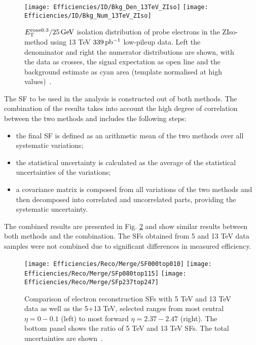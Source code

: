     \begin{figure}[htbp]
    \centering
    \texttt{[image: Efficiencies/ID/Bkg\_Den\_13TeV\_ZIso]}
    \texttt{[image: Efficiencies/ID/Bkg\_Num\_13TeV\_ZIso]}
    \caption{$E_{\text{T}}^\mathrm{cone0.3}/25 \,\text{Ge\kern -0.1em V}$ isolation distribution of
    	probe electrons in the ZIso-method using 13 TeV $339\,\mbox{pb\(^{-1}\)}$
    	low-pileup data. Left the denominator and right the numerator
    	distributions are shown, with the data as crosses, the signal \Zee
    	expectation as open line and the background estimate as cyan area
    	(template normalised at high values)~\cite{int_note_electrons}.}
    \label{fig:bkgfit_ziso}
    \end{figure} 
    
    The SF to be used in the analysis is constructed out of both methods. The combination of the results takes into account the high degree of correlation between the two methods and includes the following steps:
    \begin{itemize}
    	\item the final SF is defined as an arithmetic mean of the two methods over all systematic variations;
    	\item the statistical uncertainty is calculated as the average of the statistical uncertainties of the variations;
    	\item a covariance matrix is composed from all variations of the two methods and then decomposed into correlated and uncorrelated parts, providing the systematic uncertainty.
    \end{itemize}
    The combined results are presented in Fig. \ref{fig:reco_merge} and show similar results between both methods and the combination. The SFs obtained from 5 and 13 TeV data samples were not combined due to significant differences in measured efficiency.
    \begin{figure}[htbp]
    	\centering
    	\texttt{[image: Efficiencies/Reco/Merge/SF000top010]}%
    	\texttt{[image: Efficiencies/Reco/Merge/SFp080top115]}%
        \texttt{[image: Efficiencies/Reco/Merge/SFp237top247]}
    	

    	

    	
    	\caption{Comparison of electron reconstruction SFs with 5 TeV and 13
    		TeV data as well as the 5+13 TeV, selected  ranges from most central $\eta=0-0.1$ (left) to most forward $\eta=2.37-2.47$ (right). The bottom panel shows the ratio of 5 TeV and 13 TeV SFs. The total
    		uncertainties are shown~\cite{int_note_electrons}.}  \label{fig:reco_merge}
    \end{figure}
    

